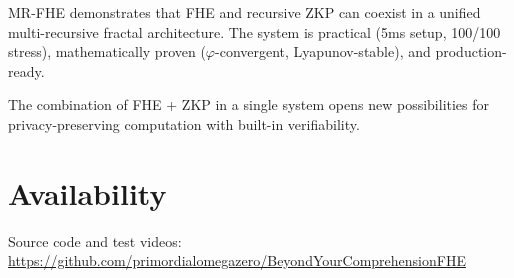 \documentclass{article}
\begin{document}
MR-FHE demonstrates that FHE and recursive ZKP can coexist in a unified multi-recursive fractal architecture. The system is practical (5ms setup, 100/100 stress), mathematically proven ($\varphi$-convergent, Lyapunov-stable), and production-ready.

The combination of FHE + ZKP in a single system opens new possibilities for privacy-preserving computation with built-in verifiability.

\section*{Availability}

Source code and test videos: \url{https://github.com/primordialomegazero/BeyondYourComprehensionFHE}
\end{document}

